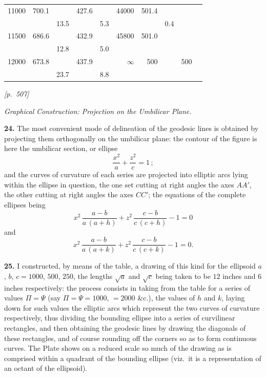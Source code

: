 \documentclass[11pt]{article}
\begin{document}
\begin{center}
\begin{tabular}{|r|r|r|r|r||r|r|r|r|r|}
11000 & 700.1 &      & 427.6 &     & 44000 & 501.4 &      &       &     \\
     &       & 13.5 &       & 5.3  &      &       & 0.4  &       &     \\
11500 & 686.6 &      & 432.9 &     & 45800 & 501.0 &      &       &     \\
     &       & 12.8 &       & 5.0  &      &       &      &       &     \\
12000 & 673.8 &      & 437.9 &     & $\infty$ & 500 &      & 500   &     \\
     &       & 23.7 &       & 8.8  &      &       &      &       &     \\ \hline
\end{tabular}
\end{center}

\newpage

\noindent\textit{[p.~507]}

\medskip

\begin{center}\textit{Graphical Construction: Projection on the
Umbilicar Plane.}\end{center}

\medskip

\textbf{24.} The most convenient mode of delineation of the geodesic
lines is obtained by projecting them orthogonally on the umbilicar
plane: the contour of the figure is here the umbilicar section, or
ellipse
\[
\frac{x^{2}}{a}+\frac{z^{2}}{c}=1\,;
\]
and the curves of curvature of each series are projected into elliptic
arcs lying within the ellipse in question, the one set cutting at right
angles the axes $AA'$, the other cutting at right angles the axes
$CC'$; the equations of the complete ellipses being
\[
x^{2}\,\frac{a-b}{a\,(a+h)}+z^{2}\,\frac{c-b}{c\,(c+h)}-1=0
\]
and
\[
x^{2}\,\frac{a-b}{a\,(a+k)}+z^{2}\,\frac{c-b}{c\,(c+k)}-1=0.
\]

\textbf{25.} I constructed, by means of the table, a drawing of this
kind for the ellipsoid $a$, $b$, $c=1000$, $500$, $250$, the lengths
$\sqrt{a}$ and $\sqrt{c}$ being taken to be $12$ inches and $6$ inches
respectively: the process consists in taking from the table for a
series of values $\Pi=\Psi$ (say $\Pi=\Psi=1000$, $=2000$ \&c.), the
values of $h$ and $k$, laying down for such values the elliptic arcs
which represent the two curves of curvature respectively, thus dividing
the bounding ellipse into a series of curvilinear rectangles, and then
obtaining the geodesic lines by drawing the diagonals of these
rectangles, and of course rounding off the corners so as to form
continuous curves. The Plate shows on a reduced scale so much of the
drawing as is comprised within a quadrant of the bounding ellipse
(viz.\ it is a representation of an octant of the ellipsoid).
\end{document}
